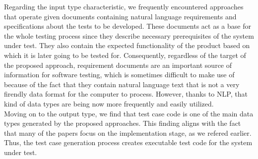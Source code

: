 Regarding the input type characteristic, we frequently encountered approaches that operate given documents containing natural language requirements and specifications about the tests to be developed. 
These documents act as a base for the whole testing process since they describe necessary prerequisites of the system under test. They also contain the expected functionality of the product based on which 
it is later going to be tested for. Consequently, regardless of the target of the proposed approach, requirement documents are an important source of information for software testing, which is sometimes 
difficult to make use of because of the fact that they contain natural language text that is not a very firendly data format for the computer to process. However, thanks to NLP, that kind of data types 
are being now more frequently and easily utilized.\\

Moving on to the output type, we find that test case code is one of the main data types generated by the proposed approaches. This finding aligns with the fact that many of the papers focus on the implementation 
stage, as we refered earlier. Thus, the test case generation process creates executable test code for the system under test.\\

